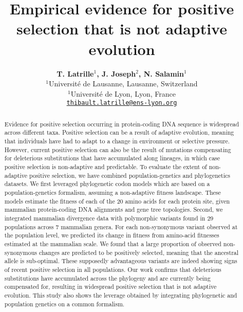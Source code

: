 \documentclass{article}
\title{Empirical evidence for positive selection that is not adaptive evolution}
\author{
    \large
    \textbf{T. {Latrille}$^{1}$, J. {Joseph}$^{2}$, N. {Salamin}$^{1}$}\\
    \normalsize
    $^{1}$Université de Lausanne, Lausanne, Switzerland\\
    $^{1}$Université de Lyon, Lyon, France \\
    \texttt{\href{mailto:thibault.latrille@ens-lyon.org}{thibault.latrille@ens-lyon.org}} \\
}
\begin{document}
    \maketitle

    \begin{abstract}
        Evidence for positive selection occurring in protein-coding DNA sequence is widespread across different taxa.
        Positive selection can be a result of adaptive evolution, meaning that individuals have had to adapt to a change in environment or selective pressure.
        However, current positive selection can also be the result of mutations compensating for deleterious substitutions that have accumulated along lineages, in which case positive selection is non-adaptive and predictable.
        To evaluate the extent of non-adaptive positive selection, we have combined population-genetics and phylogenetics datasets.
        We first leveraged phylogenetic codon models which are based on a population-genetics formalism, assuming a non-adaptive fitness landscape.
        These models estimate the fitness of each of the 20 amino acids for each protein site, given mammalian protein-coding DNA alignments and gene tree topologies.
        Second, we integrated mammalian divergence data with polymorphic variants found in 29 populations across 7 mammalian genera.
        For each non-synonymous variant observed at the population level, we predicted its change in fitness from amino-acid fitnesses estimated at the mammalian scale.
        We found that a large proportion of observed non-synonymous changes are predicted to be positively selected, meaning that the ancestral allele is sub-optimal.
        These supposedly advantageous variants are indeed showing signs of recent positive selection in all populations.
        Our work confirms that deleterious substitutions have accumulated across the phylogeny and are currently being compensated for, resulting in widespread positive selection that is not adaptive evolution.
        This study also shows the leverage obtained by integrating phylogenetic and population genetics on a common formalism.
    \end{abstract}

\end{document}
